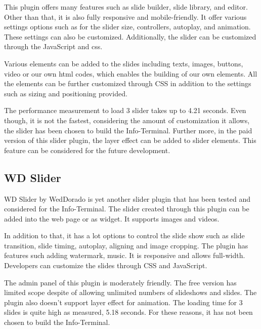 This plugin offers many features such as slide builder, slide library, and editor. Other than that, it is also fully responsive and mobile-friendly. It offer various settings options such as for the slider size, controllers, autoplay, and animation. These settings can also be customized. Additionally, the slider can be customized through the JavaScript and \ac{css}.

Various elements can be added to the slides including texts, images, buttons, video or our own \ac{html} codes, which enables the building of our own elements. All the elements can be further customized through CSS in addition to the settings such as sizing and positioning provided.

The performance measurement to load 3 slider takes up to 4.21 seconds. Even though, it is not the fastest, considering the amount of customization it allows, the slider has been chosen to build the Info-Terminal. Further more, in the paid version of this slider plugin, the layer effect can be added to slider elements. This feature can be considered for the future development.

\subsection{WD Slider}
WD Slider by WedDorado \cite{WebDorado.2016} is yet another slider plugin that has been tested and considered for the Info-Terminal. The slider created through this plugin can be added into the web page or as widget. It supports images and videos.

In addition to that, it has a lot options to control the slide show such as slide transition, slide timing, autoplay, aligning and image cropping. The plugin has features such adding watermark, music. It is responsive and allows full-width. Developers can customize the slides through CSS and JavaScript.

The admin panel of this plugin is moderately friendly. The free version has limited scope despite of allowing unlimited numbers of slideshows and slides. The plugin also doesn't support layer effect for animation. The loading time for 3 slides is quite high as measured, 5.18 seconds. For these reasons, it has not been chosen to build the Info-Terminal.